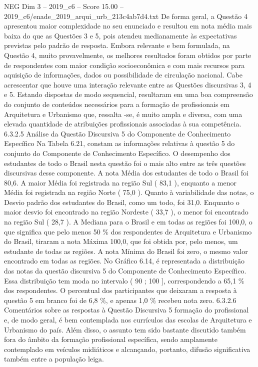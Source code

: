 \begin{textsample}{NEG Dim 3 – 2019\_c6 – Score 15.00 – 2019\_c6/enade\_2019\_arqui\_urb\_213c4ab7d4.txt}
De forma geral, a Questão 4 apresentou maior complexidade no seu enunciado e resultou em nota média mais baixa do que as Questões 3 e 5, pois atendeu medianamente às expectativas previstas pelo padrão de resposta.
Embora relevante e bem formulada, na Questão 4, muito provavelmente, os melhores resultados foram obtidos por parte de respondentes com maior condição socioeconômica e com mais recursos para aquisição de informações, dados ou possibilidade de circulação nacional.
Cabe acrescentar que houve uma interação relevante entre as Questões discursivas 3, 4 e 5.
Estando dispostas de modo sequencial, resultaram em uma boa compreensão do conjunto de conteúdos necessários para a formação de profissionais em Arquitetura e Urbanismo que, ressalta -se, é muito ampla e diversa, com uma elevada quantidade de atribuições profissionais associadas à sua competência. 6.3.2.5 Análise da Questão Discursiva 5 do Componente de Conhecimento Específico Na Tabela 6.21, constam as informações relativas à questão 5 do conjunto do Componente de Conhecimento Específico.
O desempenho dos estudantes de todo o Brasil nesta questão foi o mais alto entre as três questões discursivas desse componente.
A nota Média dos estudantes de todo o Brasil foi 80,6.
A maior Média foi registrada na região Sul ( 83,1 ), enquanto a menor Média foi registrada na região Norte ( 75,0 ).
Quanto à variabilidade das notas, o Desvio padrão dos estudantes do Brasil, como um todo, foi 31,0.
Enquanto o maior desvio foi encontrado na região Nordeste ( 33,7 ), o menor foi encontrado na região Sul ( 28,7 ).
A Mediana para o Brasil e em todas as regiões foi 100,0, o que significa que pelo menos 50 \% dos respondentes de Arquitetura e Urbanismo do Brasil, tiraram a nota Máxima 100,0, que foi obtida por, pelo menos, um estudante de todas as regiões.
A nota Mínima do Brasil foi zero, o mesmo valor encontrado em todas as regiões.
No Gráfico 6.14, é representada a distribuição das notas da questão discursiva 5 do Componente de Conhecimento Específico.
Essa distribuição tem moda no intervalo ( 90 ; 100 ], correspondendo a 65,1 \% dos respondentes.
O percentual dos participantes que deixaram a resposta à questão 5 em branco foi de 6,8 \%, e apenas 1,0 \% recebeu nota zero. 6.3.2.6 Comentários sobre as respostas à Questão Discursiva 5 formação do profissional e, de modo geral, é bem contemplada nos currículos das escolas de Arquitetura e Urbanismo do país.
Além disso, o assunto tem sido bastante discutido também fora do âmbito da formação profissional específica, sendo amplamente contemplado em veículos midiáticos e alcançando, portanto, difusão significativa também entre a população leiga.

\end{textsample}
